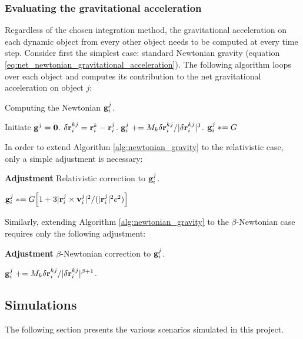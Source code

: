 \documentclass[reprint,english]{revtex4-1}
\begin{document}
\subsubsection{Evaluating the gravitational acceleration}
Regardless of the chosen integration method, the gravitational acceleration on each dynamic object from every other object needs to be computed at every time step. Consider first the simplest case: standard Newtonian gravity (equation \eqref{eq:net_newtonian_gravitational_acceleration}). The following algorithm loops over each object and computes its contribution to the net gravitational acceleration on object \(j\):
\begin{algorithm}[H]
\caption{Computing the Newtonian \(\vb{g}_i^j\).}\label{alg:newtonian_gravity}
\begin{algorithmic}[1]
\State Initiate \(\vb{g}^j=\vb{0}\).
		\State \(\delta\vb{r}_i^{kj}=\vb{r}_i^k-\vb{r}_i^j\).
		\State \(\vb{g}_i^j\mathrel{{+}{=}}M_k\delta\vb{r}_i^{kj}/|\delta\vb{r}_i^{kj}|^3\).
	\EndIf
\State \(\vb{g}_i^j\mathrel{{*}{=}}G\)
\EndFor
\end{algorithmic}
\end{algorithm}
In order to extend Algorithm \ref{alg:newtonian_gravity} to the relativistic case, only a simple adjustment is necessary:
\captionsetup[algorithm]{labelformat=empty}
\begin{algorithm}[H]
\caption{\textbf{Adjustment} Relativistic correction to \(\vb{g}_i^j\).}\label{alg:newtonian_gravity}
\begin{algorithmic}
\State \(\vb{g}_i^j\mathrel{{*}{=}}G\Big[1+3|\vb{r}_i^j\times\vb{v}_i^j|^2/(|\vb{r}_i^j|^2c^2)\Big]\)
\end{algorithmic}
\end{algorithm}
Similarly, extending Algorithm \ref{alg:newtonian_gravity} to the \(\beta\)-Newtonian case requires only the following adjustment:
\begin{algorithm}[H]
\caption{\textbf{Adjustment} \(\beta\)-Newtonian correction to \(\vb{g}_i^j\).}\label{alg:newtonian_gravity}
\begin{algorithmic}
\State \(\vb{g}_i^j\mathrel{{+}{=}}M_k\delta\vb{r}_i^{kj}/|\delta\vb{r}_i^{kj}|^{\beta+1}\).
\end{algorithmic}
\end{algorithm}
\subsection{Simulations}
The following section presents the various scenarios simulated in this project.
\end{document}
